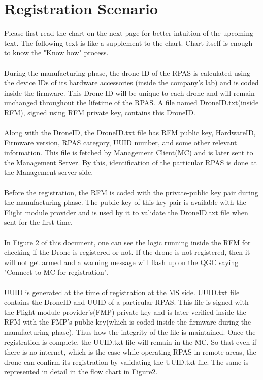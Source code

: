 \documentclass[18pt]{article}
\begin{document}
\section{Registration Scenario}
Please first read the chart on the next page for better intuition of the upcoming text. The following text is like a supplement to the chart. Chart itself is enough to know the "Know how" process.\\
\\
During the manufacturing phase, the drone ID of the RPAS is calculated using the device IDs of its hardware accessories (inside the company's lab) and is coded inside the firmware. 
This Drone ID will be unique to each drone and will remain unchanged throughout the lifetime of the RPAS. A file named DroneID.txt(inside RFM), signed using RFM private key, contains this DroneID.\\
\\
Along with the DroneID, the DroneID.txt  file has RFM public key, HardwareID, Firmware version, RPAS category, UUID number, and some other relevant information.  This file is fetched by Management Client(MC) and is later sent to the Management Server. By this, identification of the particular RPAS is done at the Management server side.\\
\\
Before the registration, the RFM  is coded with the private-public key pair during the manufacturing phase. The public key of this key pair is available with the Flight module provider and is used by it to validate the DroneID.txt file when sent for the first time.\\
\\
In Figure 2 of this document, one can see the logic running inside the RFM for checking if the Drone is registered or not. If the drone is not registered, then it will not get armed and a warning message will flash up on the QGC saying "Connect to MC for registration".\\ 
 \\
 UUID is generated at the time of registration at the MS side. UUID.txt file contains the DroneID and UUID of a particular RPAS. This file is signed with the Flight module provider's(FMP) private key and is later verified inside the RFM with the FMP's public key(which is coded inside the firmware during the manufacturing phase). Thus how the integrity of the file is maintained. Once the registration is complete, the UUID.txt file will remain in the MC. So that even if there is no internet, which is the case while operating RPAS in remote areas, the drone can confirm its registration by validating the UUID.txt file. The same is represented in detail in the flow chart in Figure2. \\
\end{document}

